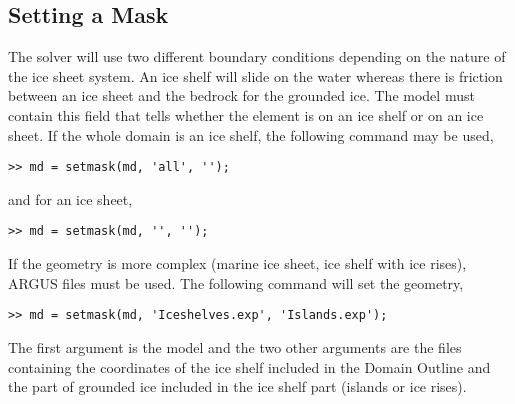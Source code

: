 
\subsection{Setting a Mask} \label{sec:using-issm-capabilities-setmask}
The solver will use two different boundary conditions depending on the nature of the ice sheet system. An ice shelf will slide on the water whereas there is friction between an ice sheet and the bedrock for the grounded ice. The model must contain this field that tells whether the element is on an ice shelf or on an ice sheet. If the whole domain is an ice shelf, the following command may be used,
\begin{lstlisting}
>> md = setmask(md, 'all', '');
\end{lstlisting}
and for an ice sheet,
\begin{lstlisting}
>> md = setmask(md, '', '');
\end{lstlisting}
If the geometry is more complex (marine ice sheet, ice shelf with ice rises), ARGUS files must be
used. The following command will set the geometry,
\begin{lstlisting}
>> md = setmask(md, 'Iceshelves.exp', 'Islands.exp');
\end{lstlisting}
The first argument is the model and the two other arguments are the files containing the coordinates of the ice shelf included in the Domain Outline and the part of grounded ice included in the ice shelf part (islands or ice rises).

\clearpage %

